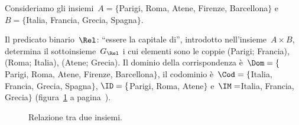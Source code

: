 \begin{exrig}
\begin{esempio}
Consideriamo gli insiemi~$A= \{$Parigi, Roma, Atene, Firenze, Barcellona$\}$ e~$B= \{$Italia, Francia, Grecia, Spagna$\}$.

Il predicato binario~$\Rel$: ``essere la capitale di'', introdotto nell'insieme~$A \times B$, determina il sottoinsieme~$G_\Rel$ i cui elementi sono le coppie (Parigi; Francia),
(Roma; Italia), (Atene; Grecia). Il dominio della corrispondenza è~$\Dom= \{$Parigi, Roma, Atene, Firenze, Barcellona$\}$, il codominio è~$\Cod= \{$Italia, Francia, Grecia, Spagna$\}$, $\ID=\{$Parigi, Roma, Atene$\}$ e~$\IM=$Italia, Francia, Grecia$\}$ (figura~\ref{fig:7.5} a pagina~\pageref{fig:7.5}).
\end{esempio}
\end{exrig}
\begin{figure}[htb]
 \centering
 \caption{Relazione tra due insiemi.}\label{fig:7.5}
\end{figure}

\ovalbox{\risolvii \ref{ese:7.44}, \ref{ese:7.45}, \ref{ese:7.46}}

